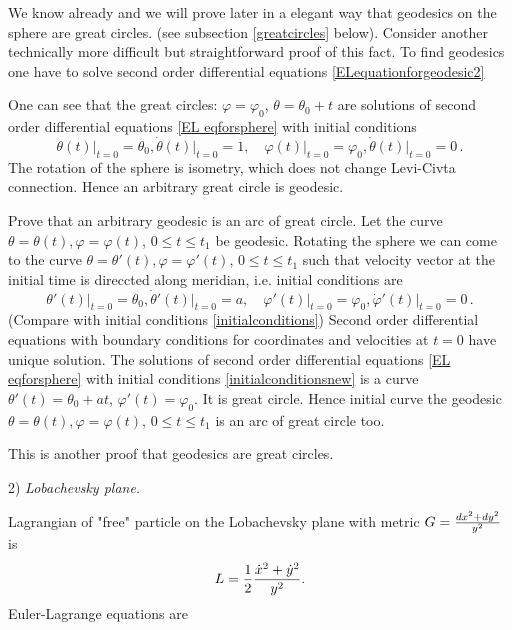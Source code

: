 \documentclass[12pt]{article}
\theoremstyle{theorem}
\numberwithin{equation}{section}
\begin{document}
{%

{\footnotesize  We know already and we will prove
later in a elegant way that geodesics on the sphere are great circles.
(see subsection \ref{greatcircles} below).
 Consider another technically more difficult but 
straightforward proof of this fact.
To find geodesics one have to solve second order 
differential equations \eqref{ELequationforgeodesic2}

One can see that the great circles: $\varphi=\varphi_0$, $\theta=\theta_0+t$ are solutions of
second order differential equations \eqref{EL eqforsphere} with initial conditions
\begin{equation}\label{initialconditions}
  \theta(t)\big\vert_{t=0}=\theta_0, \dot\theta(t)\big\vert_{t=0}=1,\quad
  \varphi(t)\big\vert_{t=0}=\varphi_0, \dot\theta(t)\big\vert_{t=0}=0\,.
\end{equation}
The rotation of the sphere is isometry, which does not change Levi-Civta connection.
Hence an arbitrary great circle is geodesic.

Prove that an arbitrary geodesic is an arc of great circle.
Let the curve $\theta=\theta(t),\varphi=\varphi(t)$,
$0\leq t\leq t_1$ be geodesic. Rotating the sphere
we can come to the curve $\theta=\theta'(t),\varphi=\varphi'(t)$, $0\leq t\leq t_1$
such that  velocity vector at the initial time is direccted along meridian, i.e.
initial conditions are
\begin{equation}\label{initialconditionsnew}
  \theta'(t)\big\vert_{t=0}=\theta_0, \dot\theta'(t)\big\vert_{t=0}=a,\quad
  \varphi'(t)\big\vert_{t=0}=\varphi_0, \dot\varphi'(t)\big\vert_{t=0}=0\,.
\end{equation}
(Compare with initial conditions \eqref{initialconditions})
Second order differential equations with boundary conditions for coordinates and velocities at $t=0$ have unique
solution. The solutions of second order differential equations \eqref{EL eqforsphere} with initial conditions
\eqref{initialconditionsnew} is a curve
                $\theta'(t)=\theta_0+at$, $\varphi'(t)=\varphi_0$. It is great circle.
                Hence initial curve the geodesic $\theta=\theta(t),\varphi=\varphi(t)$,
$0\leq t\leq t_1$ is an arc of great circle too.

This is another proof that geodesics are great circles.}


\m


2) {\it Lobachevsky plane.}


   Lagrangian of "free" particle on the Lobachevsky plane with metric $G={dx^2+dy^2\over y^2}$ is
      $$
   L={1\over 2}{\dot x^2+\dot y^2\over y^2}.
      $$
Euler-Lagrange equations are

}
\end{document}
